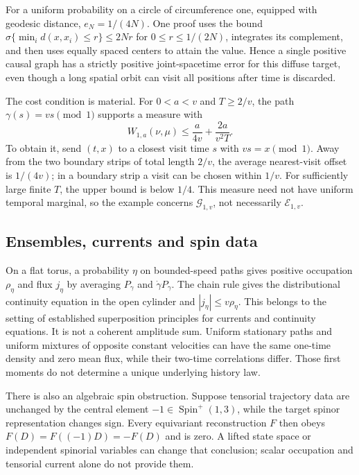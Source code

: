 \documentclass[aip,adv,reprint,onecolumn,amsmath,amssymb]{revtex4-2}
\begin{document}
For a uniform probability on a circle of circumference one, equipped with geodesic distance, $e_N=1/(4N)$. One proof uses the bound $\sigma\{\min_i d(x,x_i)\le r\}\le2Nr$ for $0\le r\le1/(2N)$, integrates its complement, and then uses equally spaced centers to attain the value. Hence a single positive causal graph has a strictly positive joint-spacetime error for this diffuse target, even though a long spatial orbit can visit all positions after time is discarded.

The cost condition is material. For $0<a<v$ and $T\ge2/v$, the path $\gamma(s)=vs\pmod1$ supports a measure with
\begin{equation}
 W_{1,a}(\nu,\mu)\le\frac a{4v}+\frac{2a}{v^2T}.
 \label{eq:cheap-time}
\end{equation}
To obtain it, send $(t,x)$ to a closest visit time $s$ with $vs=x\pmod1$. Away from the two boundary strips of total length $2/v$, the average nearest-visit offset is $1/(4v)$; in a boundary strip a visit can be chosen within $1/v$. For sufficiently large finite $T$, the upper bound is below $1/4$. This measure need not have uniform temporal marginal, so the example concerns $\mathcal G_{1,v}$, not necessarily $\mathcal E_{1,v}$.

\subsection{Ensembles, currents and spin data}
On a flat torus, a probability $\eta$ on bounded-speed paths gives positive occupation $\rho_\eta$ and flux $j_\eta$ by averaging $P_\gamma$ and $\dot\gamma P_\gamma$. The chain rule gives the distributional continuity equation in the open cylinder and $|j_\eta|\le v\rho_\eta$. This belongs to the setting of established superposition principles for currents and continuity equations.\cite{stepanov,miller} It is not a coherent amplitude sum. Uniform stationary paths and uniform mixtures of opposite constant velocities can have the same one-time density and zero mean flux, while their two-time correlations differ. Those first moments do not determine a unique underlying history law.

There is also an algebraic spin obstruction. Suppose tensorial trajectory data are unchanged by the central element $-1\in\operatorname{Spin}^+(1,3)$, while the target spinor representation changes sign. Every equivariant reconstruction $F$ then obeys $F(D)=F((-1)D)=-F(D)$ and is zero. A lifted state space or independent spinorial variables can change that conclusion; scalar occupation and tensorial current alone do not provide them.\cite{schubert}
\end{document}

